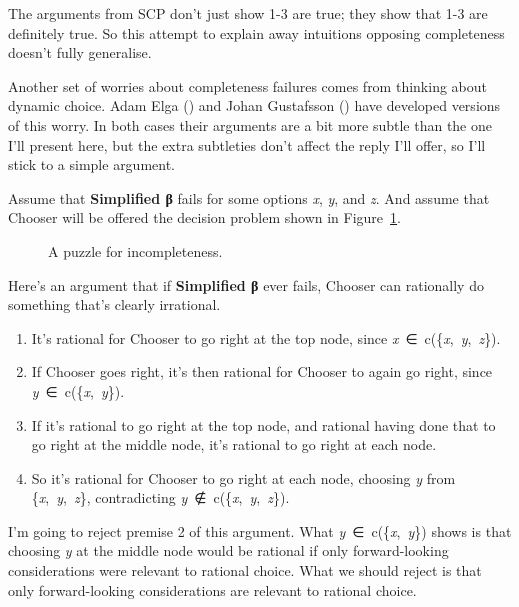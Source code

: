 \documentclass[
  10pt,
  letterpaper,
  DIV=11,
  numbers=noendperiod,
  twoside]{scrartcl}
\providecommand{\tightlist}{%
  \setlength{\itemsep}{0pt}\setlength{\parskip}{0pt}}\usepackage{longtable,booktabs,array}
\begin{document}
The arguments from SCP don't just show 1-3 are true; they show that 1-3
are definitely true. So this attempt to explain away intuitions opposing
completeness doesn't fully generalise.

Another set of worries about completeness failures comes from thinking
about dynamic choice. Adam Elga () and
Johan Gustafsson () have developed
versions of this worry. In both cases their arguments are a bit more
subtle than the one I'll present here, but the extra subtleties don't
affect the reply I'll offer, so I'll stick to a simple argument.

Assume that \textbf{Simplified β} fails for some options \emph{x},
\emph{y}, and \emph{z}. And assume that Chooser will be offered the
decision problem shown in Figure~\ref{fig-beta}.

\begin{figure}


\caption{\label{fig-beta}A puzzle for incompleteness.}

\end{figure}%

Here's an argument that if \textbf{Simplified β} ever fails, Chooser can
rationally do something that's clearly irrational.

\begin{enumerate}
\def\labelenumi{\arabic{enumi}.}
\tightlist
\item
  It's rational for Chooser to go right at the top node, since
  \emph{x}~∈~c(\{\emph{x},~\emph{y},~\emph{z}\}).
\item
  If Chooser goes right, it's then rational for Chooser to again go
  right, since \emph{y}~∈~c(\{\emph{x},~\emph{y}\}).
\item
  If it's rational to go right at the top node, and rational having done
  that to go right at the middle node, it's rational to go right at each
  node.
\item
  So it's rational for Chooser to go right at each node, choosing
  \emph{y} from \{\emph{x},~\emph{y},~\emph{z}\}, contradicting
  \emph{y}~∉~c(\{\emph{x},~\emph{y},~\emph{z}\}).
\end{enumerate}

I'm going to reject premise 2 of this argument. What
\emph{y}~∈~c(\{\emph{x},~\emph{y}\}) shows is that choosing \emph{y} at
the middle node would be rational if only forward-looking considerations
were relevant to rational choice. What we should reject is that only
forward-looking considerations are relevant to rational choice.
\end{document}

